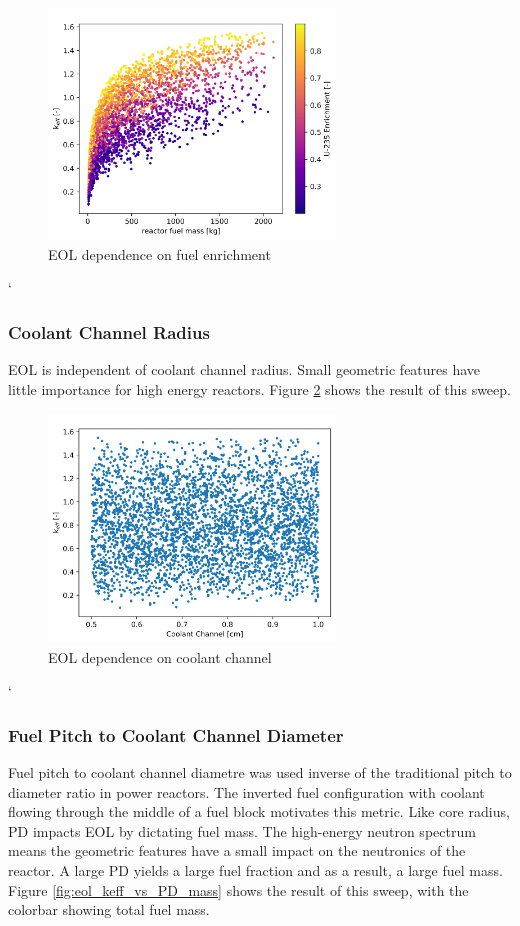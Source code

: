 \begin{figure}[h]
    \centering
    \includegraphics[width=3in]{../images/keff_vs_mass_enrich.png}
\caption{EOL \keff dependence on fuel enrichment}
\label{fig:eol_keff_vs_mass_enrich}
\end{figure}`


\subsubsection{Coolant Channel Radius}
EOL \keff is independent of coolant channel radius. Small geometric features
have little importance for high energy reactors. Figure
\ref{fig:eol_keff_vs_r_cool} shows the result of this sweep.

\begin{figure}[h]
    \centering
    \includegraphics[width=3in]{../images/keff_vs_cool_r.png}
\caption{EOL \keff dependence on coolant channel}
\label{fig:eol_keff_vs_r_cool}
\end{figure}`

\subsubsection{Fuel Pitch to Coolant Channel Diameter}
Fuel pitch to coolant channel diametre was used inverse of the traditional pitch
to diameter ratio in power reactors. The inverted fuel configuration with
coolant flowing through the middle of a fuel block motivates this metric. Like
core radius, PD impacts EOL \keff by dictating fuel mass. The high-energy
neutron spectrum means the geometric features have a small impact on the
neutronics of the reactor. A large PD yields a large fuel fraction and as a
result, a large fuel mass. Figure
\ref{fig:eol_keff_vs_PD_mass} shows the result of this sweep, with the colorbar
showing total fuel mass.

